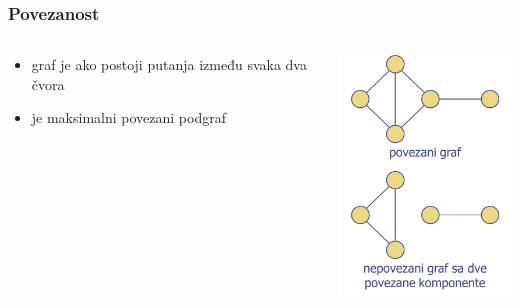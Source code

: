 \documentclass[compress]{beamer}
\begin{document}
\begin{frame}[fragile]
  \frametitle{Povezanost}
  \begin{columns}
    \begin{column}[t]{6cm}
      \begin{itemize}
        \item graf je  ako postoji putanja između svaka 
          dva čvora
        \item {} je maksimalni povezani podgraf
      \end{itemize}
    \end{column}
    \begin{column}[t]{6cm}
      \begin{center}
        \includegraphics[width=5cm]{asp-14-pic15.png}
      \end{center}
    \end{column}
  \end{columns}
\end{frame}
\end{document}
